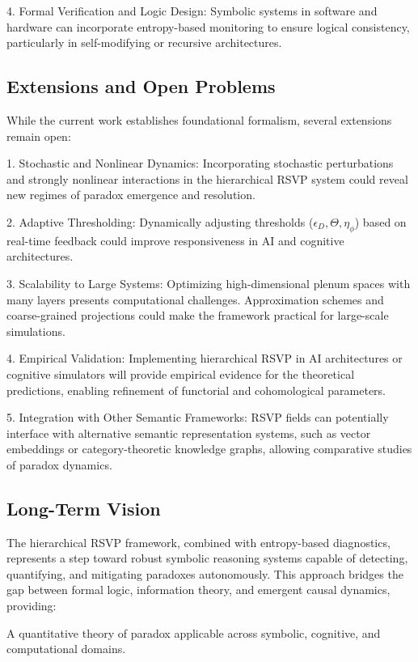 \documentclass[12pt]{article}
\theoremstyle{plain}
\begin{document}
4. Formal Verification and Logic Design: Symbolic systems in software and hardware can incorporate entropy-based monitoring to ensure logical consistency, particularly in self-modifying or recursive architectures.

\subsection{Extensions and Open Problems}

While the current work establishes foundational formalism, several extensions remain open:

1. Stochastic and Nonlinear Dynamics: Incorporating stochastic perturbations and strongly nonlinear interactions in the hierarchical RSVP system could reveal new regimes of paradox emergence and resolution.

2. Adaptive Thresholding: Dynamically adjusting thresholds (\(\epsilon_D, \Theta, \eta_\phi\)) based on real-time feedback could improve responsiveness in AI and cognitive architectures.

3. Scalability to Large Systems: Optimizing high-dimensional plenum spaces with many layers presents computational challenges. Approximation schemes and coarse-grained projections could make the framework practical for large-scale simulations.

4. Empirical Validation: Implementing hierarchical RSVP in AI architectures or cognitive simulators will provide empirical evidence for the theoretical predictions, enabling refinement of functorial and cohomological parameters.

5. Integration with Other Semantic Frameworks: RSVP fields can potentially interface with alternative semantic representation systems, such as vector embeddings or category-theoretic knowledge graphs, allowing comparative studies of paradox dynamics.

\subsection{Long-Term Vision}

The hierarchical RSVP framework, combined with entropy-based diagnostics, represents a step toward robust symbolic reasoning systems capable of detecting, quantifying, and mitigating paradoxes autonomously. This approach bridges the gap between formal logic, information theory, and emergent causal dynamics, providing:

A quantitative theory of paradox applicable across symbolic, cognitive, and computational domains.
\end{document}
